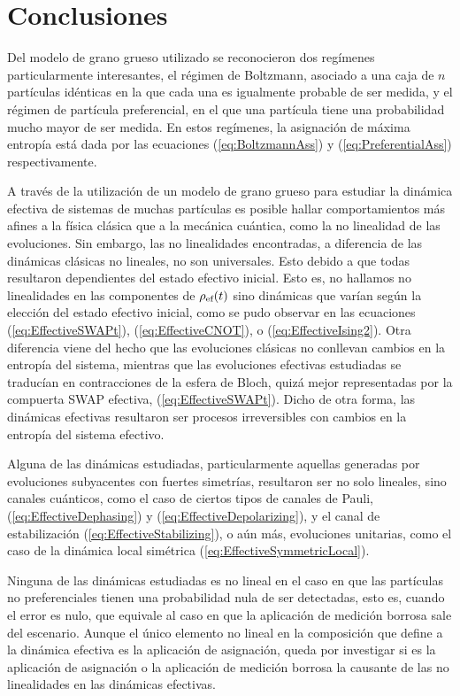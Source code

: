 \chapter{Conclusiones}
Del modelo de grano grueso utilizado se reconocieron dos regímenes particularmente interesantes, el régimen de Boltzmann, asociado a una caja de $n$ partículas idénticas en la que cada una es igualmente probable de ser medida, y el régimen de partícula preferencial, en el que una partícula tiene una probabilidad mucho mayor de ser medida. En estos regímenes, la asignación de máxima entropía está dada por las ecuaciones (\ref{eq:BoltzmannAss}) y (\ref{eq:PreferentialAss}) respectivamente.

A través de la utilización de un modelo de grano grueso para estudiar la dinámica efectiva de sistemas de muchas partículas es posible hallar comportamientos más afines a la física clásica que a la mecánica cuántica, como la no linealidad de las evoluciones. Sin embargo, las no linealidades encontradas, a diferencia de las dinámicas clásicas no lineales, no son universales. Esto debido a que todas resultaron dependientes del estado efectivo inicial. Esto es, no hallamos no linealidades en las componentes de $\rho_{\text{ef}}(t)$ sino dinámicas que varían según la elección del estado efectivo inicial, como se pudo observar en las ecuaciones (\ref{eq:EffectiveSWAPt}), (\ref{eq:EffectiveCNOT}), o (\ref{eq:EffectiveIsing2}). Otra diferencia viene del hecho que las evoluciones clásicas no conllevan cambios en la entropía del sistema, mientras que las evoluciones efectivas estudiadas se traducían en contracciones de la esfera de Bloch, quizá mejor representadas por la compuerta SWAP efectiva, (\ref{eq:EffectiveSWAPt}). Dicho de otra forma, las dinámicas efectivas resultaron ser procesos irreversibles con cambios en la entropía del sistema efectivo.

 Alguna de las dinámicas estudiadas, particularmente aquellas generadas por evoluciones subyacentes con fuertes simetrías, resultaron ser no solo lineales, sino canales cuánticos, como el caso de ciertos tipos de canales de Pauli, (\ref{eq:EffectiveDephasing}) y (\ref{eq:EffectiveDepolarizing}), y el canal de estabilización (\ref{eq:EffectiveStabilizing}), o aún más, evoluciones unitarias, como el caso de la dinámica local simétrica (\ref{eq:EffectiveSymmetricLocal}). 

Ninguna de las dinámicas estudiadas es no lineal en el caso en que las partículas no preferenciales tienen una probabilidad nula de ser detectadas, esto es, cuando el error es nulo, que equivale al caso en que la aplicación de medición borrosa sale del escenario. Aunque el único elemento no lineal en la composición que define a la dinámica efectiva es la aplicación de asignación, queda por investigar si es la aplicación de asignación o la aplicación de medición borrosa la causante de las no linealidades en las dinámicas efectivas.